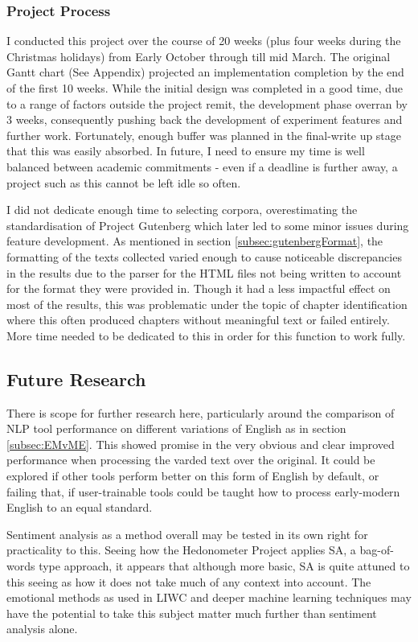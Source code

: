 \documentclass{article}
\begin{document}
        \subsubsection{Project Process}
            I conducted this project over the course of 20 weeks (plus four weeks during the Christmas holidays) from Early October through till mid March. The original Gantt chart (See Appendix) projected an implementation completion by the end of the first 10 weeks. While the initial design was completed in a good time, due to a range of factors outside the project remit, the development phase overran by 3 weeks, consequently pushing back the development of experiment features and further work. Fortunately, enough buffer was planned in the final-write up stage that this was easily absorbed. In future, I need to ensure my time is well balanced between academic commitments - even if a deadline is further away, a project such as this cannot be left idle so often.

            I did not dedicate enough time to selecting corpora, overestimating the standardisation of Project Gutenberg which later led to some minor issues during feature development. As mentioned in section \ref{subsec:gutenbergFormat}, the formatting of the texts collected varied enough to cause noticeable discrepancies in the results due to the parser for the HTML files not being written to account for the format they were provided in. Though it had a less impactful effect on most of the results, this was problematic under the topic of chapter identification where this often produced chapters without meaningful text or failed entirely. More time needed to be dedicated to this in order for this function to work fully.
    \subsection{Future Research}
        There is scope for further research here, particularly around the comparison of NLP tool performance on different variations of English as in section \ref{subsec:EMvME}. This showed promise in the very obvious and clear improved performance when processing the varded text over the original. It could be explored if other tools perform better on this form of English by default, or failing that, if user-trainable tools could be taught how to process early-modern English to an equal standard.

        Sentiment analysis as a method overall may be tested in its own right for practicality to this. Seeing how the Hedonometer Project applies SA, a bag-of-words type approach, it appears that although more basic, SA is quite attuned to this seeing as how it does not take much of any context into account. The emotional methods as used in LIWC and deeper machine learning techniques may have the potential to take this subject matter much further than sentiment analysis alone.
\end{document}

